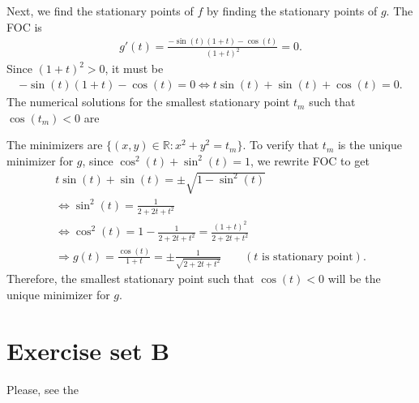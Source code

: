 \documentclass[letterpaper,10pt,english]{jupyterBook}
\begin{document}
\sphinxAtStartPar
Next, we find the stationary points of \(f\) by finding the stationary points of \(g\).
The FOC is
\begin{equation*}
\begin{split}
g'(t) = \frac{-\sin(t)(1+t) - \cos(t)}{(1+t)^2} = 0.
\end{split}
\end{equation*}
\sphinxAtStartPar
Since \((1+t)^2>0\), it must be
\begin{equation*}
\begin{split}
-\sin(t)(1+t) - \cos(t) = 0 ⇔ t\sin(t) + \sin(t) + \cos(t)=0.
\end{split}
\end{equation*}
\sphinxAtStartPar
The numerical solutions for the smallest stationary point \(t_m\) such that \(\cos(t_m)<0\) are

\begin{figure}[htbp]
\centering

\noindent{}
\end{figure}

\sphinxAtStartPar
{}

\sphinxAtStartPar
{}

\sphinxAtStartPar
The minimizers are \(\{(x,y)\in\mathbb{R}: x^2+y^2 = t_m\}\).
To verify that \(t_m\) is the unique minimizer for \(g\), since \(\cos^2(t) + \sin^2(t)=1\), we rewrite FOC to get
\begin{equation*}
\begin{split}
t\sin(t) + \sin(t) = \pm \sqrt{1-\sin^2(t)} \\
⇔ \sin^2(t) = \frac{1}{2 + 2t + t^2} \\
⇔ \cos^2(t) = 1 - \frac{1}{2+2t + t^2}=\frac{(1+t)^2}{2+2t + t^2}\\
⇒ g(t) = \frac{\cos(t)}{1+t} = \pm \frac{1}{\sqrt{2+2t +t^2}}  \qquad (\text{$t$ is stationary point}).
\end{split}
\end{equation*}
\sphinxAtStartPar
Therefore, the smallest stationary point such that \(\cos(t) < 0\) will be the unique minimizer for \(g\).

\sphinxstepscope


\chapter{Exercise set B}
\label{\detokenize{03.exercises:exercise-set-b}}\label{\detokenize{03.exercises::doc}}
\sphinxAtStartPar
Please, see the
{\hyperref[\detokenize{02.exercises::doc}]{}}
\end{document}
